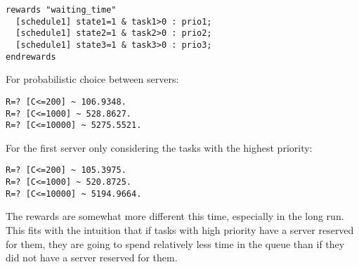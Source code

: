 \begin{verbatim}
rewards "waiting_time"
  [schedule1] state1=1 & task1>0 : prio1;
  [schedule1] state2=1 & task2>0 : prio2;
  [schedule1] state3=1 & task3>0 : prio3;
endrewards
\end{verbatim}

For probabilistic choice between servers:

\begin{verbatim}
R=? [C<=200] ~ 106.9348.
R=? [C<=1000] ~ 528.8627.
R=? [C<=10000] ~ 5275.5521.
\end{verbatim}

For the first server only considering the tasks with the highest priority:

\begin{verbatim}
R=? [C<=200] ~ 105.3975.
R=? [C<=1000] ~ 520.8725.
R=? [C<=10000] ~ 5194.9664.
\end{verbatim}

The rewards are somewhat more different this time,
especially in the long run.
This fits with the intuition that if tasks with high priority
have a server reserved for them, they are going to spend relatively
less time in the queue than if they did not have a server reserved for them.

